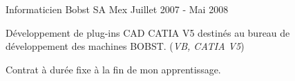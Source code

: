 \begin{cventries}

\cventry
{Informaticien} %
{Bobst SA} %
{Mex} %
{Juillet 2007 - Mai 2008} %
{ %
\begin{cvitems}
\item {Développement de plug-ins CAD CATIA V5 destinés au bureau de développement des machines BOBST. (\emph{VB, CATIA V5})}
\item {Contrat à durée fixe à la fin de mon apprentissage.}
\end{cvitems}
}


\end{cventries}
